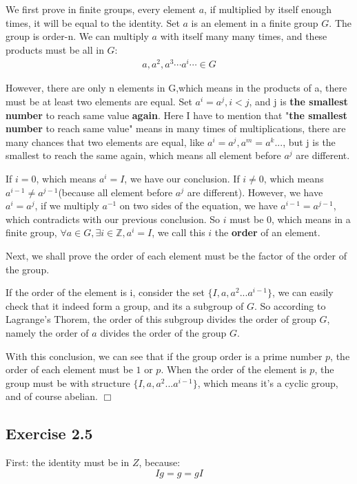 \documentclass[]{ctexart}
\begin{document}
     We first prove in finite groups, every element $ a $, if multiplied by itself enough times, it will be equal to the identity. Set $ a $ is an element in a finite group $ G $. The group is order-n. We can multiply $ a $ with itself many many times, and these products must be all in $ G $:
    \begin{equation*}
    \begin{aligned}
    	a,a^2,a^3\cdots a^i \cdots \in G
    \end{aligned}
    \end{equation*}
    
    However, there are only n elements in G,which means in the products of a, there must be at least two elements are equal. Set $a^i=a^j,i<j$, and j is \textbf{the smallest number}  to reach same value \textbf{again}. Here I have to mention that "\textbf{the smallest number}  to reach same value" means in many times of multiplications, there are many chances that two elements are equal, like $a^i=a^j,a^m=a^k...$, but j is the smallest to reach the same again, which means all element before $a^j$ are different. 
    
    If $ i=0 $, which means $ a^i=I $, we have our conclusion. If $i\ne 0$, which means $a^{i-1}\ne a^{j-1}$(because all element before $a^j$ are different). However, we have $a^i=a^j$, if we multiply $ a^{-1} $ on two sides of the equation, we have $a^{i-1}=a^{j-1}$, which contradicts with our previous conclusion. So $ i $ must be 0, which means in a finite group, $\forall a\in G, \exists i\in \mathbb{Z}, a^i=I$, we call this $ i $ the \textbf{order} of an element. 
    
    Next, we shall prove the order of each element must be the factor of the order of the group. 
    
    If the order of the element is i, consider the set $ \{I,a,a^2...a^{i-1}\} $, we can easily check that it indeed form a group, and its a subgroup of $ G $. So according to Lagrange's Thorem, the order of this subgroup divides the order of group $ G $, namely the order of $ a $ divides the order of the group $ G $. 
    
    With this conclusion, we can see that if the group order is a prime number $ p $, the order of each element must be $ 1 $ or $ p $. When the order of the element is $ p $, the group must be with structure  $ \{I,a,a^2...a^{i-1}\} $, which means it's a cyclic group, and of course abelian. \qquad $\Box$
    
    \subsection{Exercise 2.5}
    First: the identity must be in $Z$, because:
    \begin{equation*}
    	Ig=g=gI
    \end{equation*}
    
\end{document}
